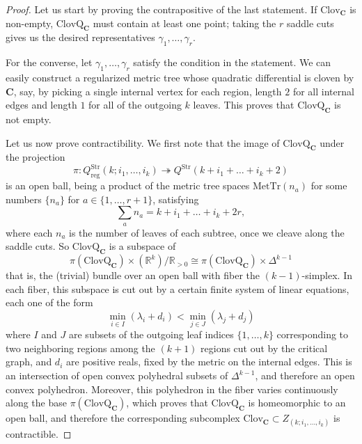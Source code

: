 \documentclass[11pt,a4paper]{amsart}
\newcommand{\RR}{\ensuremath{\mathbb{R}}}
\theoremstyle{definition}
\begin{document}
\begin{proof}
    Let us start by proving the contrapositive of the last statement. If $\mathrm{Clov}_\mathbf{C}$ is non-empty, $\mathrm{ClovQ}_\mathbf{C}$ must contain at least one point; taking the $r$ saddle cuts gives us the desired representatives $\gamma_1,\dots,\gamma_r$.

    For the converse, let $\gamma_1,\dots,\gamma_r$ satisfy the condition in the statement. We can easily construct a regularized metric tree whose quadratic differential is cloven by $\mathbf{C}$, say, by picking a single internal vertex for each region, length $2$ for all internal edges and length $1$ for all of the outgoing $k$ leaves. This proves that $\mathrm{ClovQ}_\mathbf{C}$ is not empty.

    Let us now prove contractibility. We first note that the image of $\mathrm{ClovQ}_\mathbf{C}$ under the projection
    \[ \pi \colon Q^\mathrm{Str}_\mathrm{reg}(k;i_1,\dots,i_k) \twoheadrightarrow Q^\mathrm{Str}(k + i_1 + \dots + i_k + 2) \]
    is an open ball, being a product of the metric tree spaces $\mathrm{MetTr}(n_a)$ for some numbers $\{n_a\}$ for $a \in \{1,\dots,r+1\}$, satisfying
    \[ \sum_a n_a = k + i_1 + \dots + i_k + 2r, \]
    where each $n_a$ is the number of leaves of each subtree, once we cleave along the saddle cuts. So $\mathrm{ClovQ}_\mathbf{C}$ is a subspace of
    \[ \pi(\mathrm{ClovQ}_\mathbf{C}) \times (\RR^k)/\RR_{>0} \cong \pi(\mathrm{ClovQ}_\mathbf{C}) \times \Delta^{k-1} \]
    that is, the (trivial) bundle over an open ball with fiber the $(k-1)$-simplex. In each fiber, this subspace is cut out by a certain finite system of linear equations, each one of the form
    \[ \min_{i \in I} (\lambda_i+d_i) < \min_{j \in J} (\lambda_j + d_j) \]
    where $I$ and $J$ are subsets of the outgoing leaf indices $\{1,\dots,k\}$ corresponding to two neighboring regions among the $(k+1)$ regions cut out by the critical graph, and $d_i$ are positive reals, fixed by the metric on the internal edges. This is an intersection of open convex polyhedral subsets of $\Delta^{k-1}$, and therefore an open convex polyhedron. Moreover, this polyhedron in the fiber varies continuously along the base $\pi(\mathrm{ClovQ}_\mathbf{C})$, which proves that $\mathrm{ClovQ}_\mathbf{C}$ is homeomorphic to an open ball, and therefore the corresponding subcomplex $\mathrm{Clov}_\mathbf{C} \subset  Z_{(k;i_1,\dots,i_k)}$ is contractible.
\end{proof}
\end{document}
